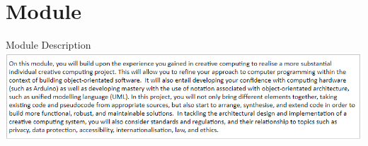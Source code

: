 \part{Module}
\frame{\partpage}

\begin{frame}{Module Description}
	\includegraphics[width=\linewidth,height=\textheight,keepaspectratio]{module_description}
\end{frame}